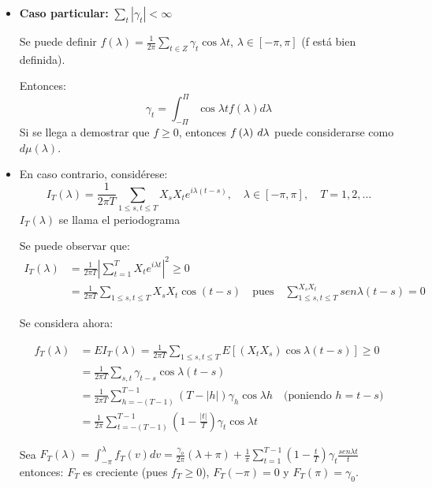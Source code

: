 \begin{itemize}
      \item \textbf{Caso particular:} $\sum\limits_t {\left| {\gamma_{t} } \right|<\infty }$\newline

Se puede definir $f\left( \lambda \right)=\frac{1}{2\pi }\sum\limits_{t\in Z} {\gamma_{t} \cos \lambda t}$, $\lambda \in \left[ {-\pi ,\pi } \right]$ (f est\'{a} bien definida).\newline

Entonces: 
\[
\gamma_{t} =\int_{-\Pi }^\Pi {\cos \lambda t} 
f\left( \lambda \right)d\lambda 
\]
Si se llega a demostrar que $f\ge 0$, entonces $f\left( \lambda \right){\kern 1pt}{\kern 1pt}d\lambda $ puede considerarse como $d\mu \left( \lambda \right)$.

      \item En caso contrario, consid\'{e}rese: 
\[
I_{T} (\lambda)=\frac{1}{2\pi T}\sum\limits_{1\le s,t\le T} {X_{s} } X_{t} e^{i\lambda (t-s)},\quad \lambda \in \left[-\pi, \pi \right], \quad T=1,2,\ldots
\]
$I_{T}(\lambda)$ se llama el periodograma

Se puede observar que:
\begin{align*}
I_{T} \left( \lambda \right) & = \frac{1}{2\pi T}\left| {\sum\limits_{t=1}^T {X_{t} e^{i\lambda t}} } \right|^{2}\ge 0\\
                             & = \frac{1}{2\pi T}\sum\limits_{1\le s,t\le T} {X_{s} X_{t} \cos ( t-s)} \quad \text{pues}\quad \limits \sum\limits_{1\le s,t\le T}^ {X_{s} X_{t} } sen\lambda (t-s)=0
\end{align*}

Se considera ahora: 

\begin{align*}
f_{T} (\lambda) &= EI_{T} (\lambda)=\frac{1}{2\pi T}\sum\limits_{1\leq s,t\leq T} {E\left[ {\left(X_{t} X_{s} \right)\cos \lambda (t-s)} \right]\ge 0}\\
                &= \frac{1}{2\pi T}\sum\limits_{s,t} {\gamma_{t-s} } \cos \lambda \left( {t-s} \right)\\
                &= \frac{1}{2\pi T}\sum\limits_{h=-(T-1)}^{T-1} {\left(T-|h| \right)}\gamma_{h} \cos \lambda h\quad \text{(poniendo $h=t-s$)}\\
                &= \frac{1}{2\pi }\sum\limits_{t=-(T-1)}^{T-1} {\left( {1-\frac{\left| t \right|}{T}} \right)} \gamma_{t} \cos \lambda t
\end{align*}

Sea $F_{T}(\lambda)=\int_{-\pi }^\lambda {f_{T} (v)dv=\frac{\gamma_{o}}{2\pi}(\lambda +\pi)+\frac{1}{\pi}\displaystyle\sum\limits_{t=1}^{T-1} {\left( {1-\frac{t}{T}} \right)}\gamma_{t} \frac{sen\lambda t}{t}}$ entonces: $F_{T}$ es creciente (pues $f_{T} \ge 0$),  $F_{T}(-\pi)=0$ y $F_{T}(\pi)=\gamma_{0}$.

\end{itemize}

